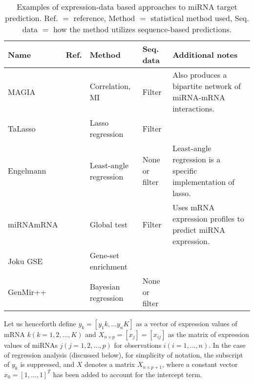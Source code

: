 \begin{table}
  \caption{Examples of expression-data based approaches to miRNA target prediction.
  Ref. $=$ reference, Method $=$ statistical method used, Seq. data $=$ how the method utilizes sequence-based predictions.}
  \label{table:expression-methods}
  \centering
  \begingroup\small
  \begin{tabular}{ llllp{4cm} }
    \\[-1ex] \hline\hline
    \textbf{Name} & \textbf{Ref.} & \textbf{Method} & \textbf{Seq. data} & \textbf{Additional notes} \\
    \hline
    MAGIA     & \citep{Sales2010}      & Correlation, MI        & Filter & Also produces a bipartite network of miRNA-mRNA interactions. \\
    TaLasso   & \citep{Muniategui2013} & Lasso regression       & Filter &  \\
    Engelmann & \citep{Engelmann2012}  & Least-angle regression & None or filter & Least-angle regression is a specific implementation of lasso. \\
    miRNAmRNA & \citep{vanIterson2013} & Global test & Filter   & Uses mRNA expression profiles to predict miRNA expression. \\
    Joku GSE  &                        & Gene-set enrichment    & \\
    GenMir++  & \citep{Huang2007}      & Bayesian regression    & None or filter & \\
    \hline\hline
    \end{tabular}
    \endgroup
\end{table}

Let us henceforth define $y_k = [y_1k, \dotsc y_nK]$ as a vector of expression
values of mRNA $k (k = 1, 2, \dotsc, K)$ and $X_{n \times p} = [x_j] =
[x_{ij}]$ as the matrix of expression values of miRNAs $j (j = 1, 2, \ldots,
p)$ for observations $i (i = 1, \ldots, n)$. In the case of regression
analysis (discussed below), for simplicity of notation, the subscript of $y_k$
is suppressed, and $X$ denotes a matrix $X_{n \times p+1}$, where a constant
vector $x_0 = [1, \ldots, 1]^T$ has been added to account for the intercept
term.

